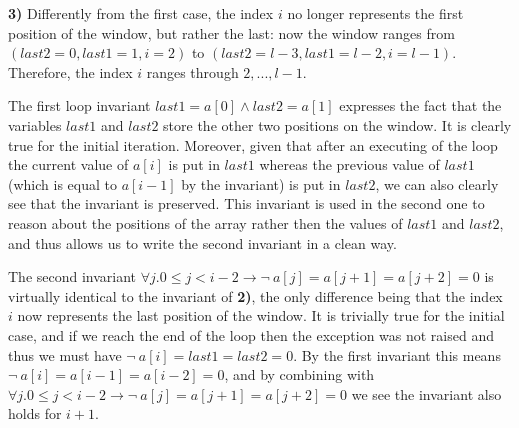 \documentclass[]{StandardTemplate}
\begin{document}
\textbf{3)} Differently from the first case, the index $ i $ no longer represents the first position of the window, but rather the last: now the window ranges from $ (last2 = 0, last1 = 1, i = 2) $ to $ (last2  = l-3, last1  = l-2, i = l-1) $. Therefore, the index $ i $ ranges through $ 2,...,l-1 $.

The first loop invariant $ last1=a[0] \land last2= a[1]$ expresses the fact that the variables $ last1 $ and $ last2 $ store the other two positions on the window. It is clearly true for the initial iteration. Moreover, given that after an executing of the loop the current value of $ a[i] $ is put in $ last1 $ whereas the previous value of $ last1 $ (which is equal to $ a[i-1] $ by the invariant) is put in $ last2 $, we can also clearly see that the invariant is preserved. This invariant is used in the second one to reason about the positions of the array rather then the values of $ last1 $ and $ last2 $, and thus allows us to write the second invariant in a clean way.

The second invariant $ \forall j. 0 \leq j < i-2 \to \neg~a[j]=a[j+1]=a[j+2]=0 $ is virtually identical to the invariant of \textbf{2)}, the only difference being that the index $ i $ now represents the last position of the window. It is trivially true for the initial case, and if we reach the end of the loop then the exception was not raised and thus we must have $ \neg~a[i]=last1=last2 =0 $. By the first invariant this means $ \neg~a[i]=a[i-1]=a[i-2]=0 $, and by combining with $\forall j. 0 \leq j < i-2 \to \neg~a[j]=a[j+1]=a[j+2]=0 $ we see the invariant also holds for $ i+1 $.
\end{document}
